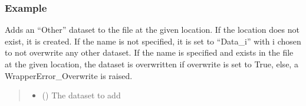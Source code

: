 \documentclass[letterpaper,10pt,english]{sphinxmanual}
\begin{document}
\begin{fulllineitems}
\begin{fulllineitems}
\begin{quote}
\begin{description}
\begin{itemize}
\end{itemize}

\end{description}\end{quote}
\subsubsection*{Example}

\begin{sphinxVerbatim}[commandchars=\\\{\}]
   
  
\end{sphinxVerbatim}

\end{fulllineitems}


\begin{fulllineitems}
\label{\detokenize{source/_autosummary/HDF5_BLS.Wrapper:HDF5_BLS.Wrapper.add_other}}
\pysigstartsignatures
\pysiglinewithargsret
{}
{\sphinxparamcomma {}\sphinxparamcomma {}\sphinxparamcomma {}}
{}
\pysigstopsignatures
\sphinxAtStartPar
Adds an “Other” dataset to the file at the given location. If the location does not exist, it is created. If the name is not specified, it is set to “Data\_i” with i chosen to not overwrite any other dataset. If the name is specified and exists in the file at the given location, the dataset is overwritten if overwrite is set to True, else, a WrapperError\_Overwrite is raised.
\begin{quote}\begin{description}
\begin{itemize}
\item {} 
\sphinxAtStartPar
{} () \textendash{} The dataset to add


\end{itemize}
\end{description}
\end{quote}
\end{fulllineitems}
\end{fulllineitems}
\end{document}
